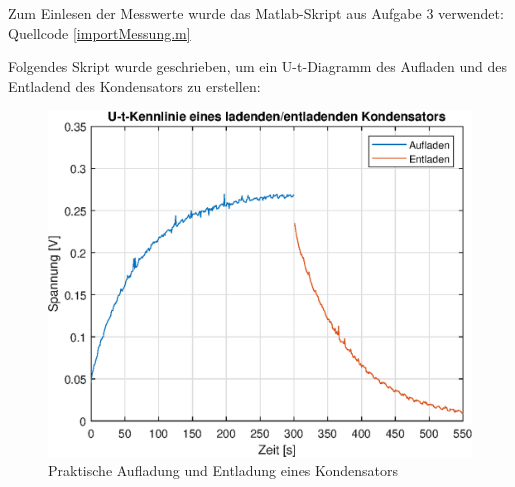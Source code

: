 Zum Einlesen der Messwerte wurde das Matlab-Skript aus Aufgabe 3 verwendet: Quellcode \ref{importMessung.m}


Folgendes Skript wurde geschrieben, um ein U-t-Diagramm des Aufladen und des Entladend des Kondensators zu erstellen:


\begin{figure}[htb]
\centering
\includegraphics[width=12cm]{pictures/Kondensator/Aufladen-Entladen.eps}
\caption{Praktische Aufladung und Entladung eines Kondensators}
\label{fig:entladung-praxis}
\end{figure}

\clearpage
{}

